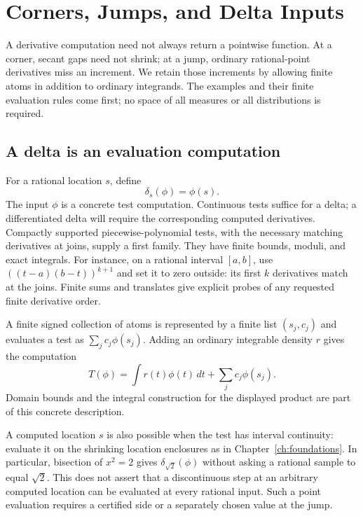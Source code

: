 \chapter{Corners, Jumps, and Delta Inputs}\label{ch:impulses}

A derivative computation need not always return a pointwise function.
At a corner, secant gaps need not shrink; at a jump, ordinary rational-point
derivatives miss an increment.  We retain those increments by allowing
finite atoms in addition to ordinary integrands.  The examples and their
finite evaluation rules come first; no space of all measures or all
distributions is required.

\section{A delta is an evaluation computation}
For a rational location $s$, define
\[
 \delta_s(\phi)=\phi(s).
\]
The input $\phi$ is a concrete test computation.  Continuous tests suffice
for a delta; a differentiated delta will require the corresponding
computed derivatives.  Compactly supported piecewise-polynomial tests,
with the necessary matching derivatives at joins, supply a first family.
They have finite bounds, moduli, and exact integrals.  For instance, on a
rational interval $[a,b]$, use $((t-a)(b-t))^{k+1}$ and set it to zero
outside: its first $k$ derivatives match at the joins.  Finite sums and
translates give explicit probes of any requested finite derivative order.

A finite signed collection of atoms is represented by a finite list
$(s_j,c_j)$ and evaluates a test as $\sum_jc_j\phi(s_j)$.  Adding an
ordinary integrable density $r$ gives the computation
\[
 T(\phi)=\int r(t)\phi(t)\,dt+\sum_jc_j\phi(s_j).
\]
Domain bounds and the integral construction for the displayed product are
part of this concrete description.

A computed location $s$ is also possible when the test has interval
continuity: evaluate it on the shrinking location enclosures as in
Chapter~\ref{ch:foundations}.  In particular, bisection of $x^2=2$ gives
$\delta_{\sqrt2}(\phi)$ without asking a rational sample to equal
$\sqrt2$.  This does not assert that a discontinuous step at an arbitrary
computed location can be evaluated at every rational input.  Such a
point evaluation requires a certified side or a separately chosen value
at the jump.

